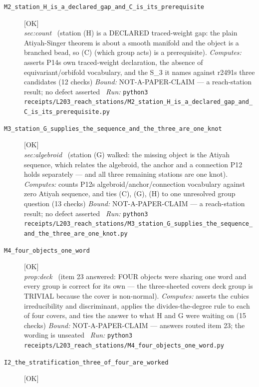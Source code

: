 \begin{description}
\item[\label{rcpt:M2_station_H_is_a_declared_gap_and_C_is_its_prerequisite}\texttt{M2\_station\_H\_is\_a\_declared\_gap\_and\_C\_is\_its\_prerequisite}]\hfill\textsf{[OK]}\\
\textit{sec:count} \ (station (H) is a DECLARED traced-weight gap: the plain Atiyah-Singer theorem is about a smooth manifold and the object is a branched bead, so (C) (which group acts) is a prerequisite). 
\emph{Computes:} asserts P14s own traced-weight declaration, the absence of equivariant/orbifold vocabulary, and the S\_3 it names against r2491s three candidates (12 checks)
 \emph{Bound:} NOT-A-PAPER-CLAIM --- a reach-station result; no defect asserted
\ \emph{Run:} \texttt{python3 receipts/L203\_reach\_stations/M2\_station\_H\_is\_a\_declared\_gap\_and\_C\_is\_its\_prerequisite.py}
\item[\label{rcpt:M3_station_G_supplies_the_sequence_and_the_three_are_one_knot}\texttt{M3\_station\_G\_supplies\_the\_sequence\_and\_the\_three\_are\_one\_knot}]\hfill\textsf{[OK]}\\
\textit{sec:algebroid} \ (station (G) walked: the missing object is the Atiyah sequence, which relates the algebroid, the anchor and a connection P12 holds separately --- and all three remaining stations are one knot). 
\emph{Computes:} counts P12s algebroid/anchor/connection vocabulary against zero Atiyah sequence, and ties (C), (G), (H) to one unresolved group question (13 checks)
 \emph{Bound:} NOT-A-PAPER-CLAIM --- a reach-station result; no defect asserted
\ \emph{Run:} \texttt{python3 receipts/L203\_reach\_stations/M3\_station\_G\_supplies\_the\_sequence\_and\_the\_three\_are\_one\_knot.py}
\item[\label{rcpt:M4_four_objects_one_word}\texttt{M4\_four\_objects\_one\_word}]\hfill\textsf{[OK]}\\
\textit{prop:deck} \ (item 23 answered: FOUR objects were sharing one word and every group is correct for its own --- the three-sheeted covers deck group is TRIVIAL because the cover is non-normal). 
\emph{Computes:} asserts the cubics irreducibility and discriminant, applies the divides-the-degree rule to each of four covers, and ties the answer to what H and G were waiting on (15 checks)
 \emph{Bound:} NOT-A-PAPER-CLAIM --- answers routed item 23; the wording is unseated
\ \emph{Run:} \texttt{python3 receipts/L203\_reach\_stations/M4\_four\_objects\_one\_word.py}
\item[\label{rcpt:I2_the_stratification_three_of_four_are_worked}\texttt{I2\_the\_stratification\_three\_of\_four\_are\_worked}]\hfill\textsf{[OK]}\\

\end{description}

